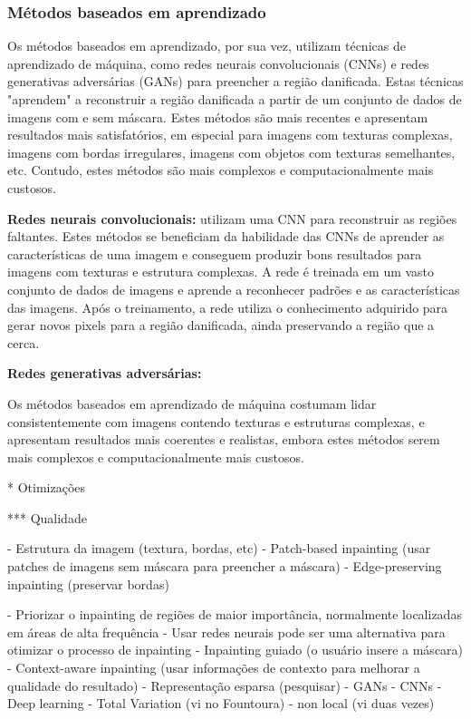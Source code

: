 \subsubsection{Métodos baseados em aprendizado} \label{learn}
Os métodos baseados em aprendizado, por sua vez, utilizam técnicas de aprendizado de máquina, como redes neurais convolucionais (CNNs) e redes generativas adversárias (GANs) para preencher a região danificada. Estas técnicas "aprendem" a reconstruir a região danificada a partir de um conjunto de dados de imagens com e sem máscara. Estes métodos são mais recentes e apresentam resultados mais satisfatórios, em especial para imagens com texturas complexas, imagens com bordas irregulares, imagens com objetos com texturas semelhantes, etc. Contudo, estes métodos são mais complexos e computacionalmente mais custosos.

\begin{list}{}{}
\item \textbf{Redes neurais convolucionais:} \label{cnn}
utilizam uma CNN para reconstruir as regiões faltantes. Estes métodos se beneficiam da habilidade das CNNs de aprender as características de uma imagem e conseguem produzir bons resultados para imagens com texturas e estrutura complexas. A rede é treinada em um vasto conjunto de dados de imagens e aprende a reconhecer padrões e as características das imagens. Após o treinamento, a rede utiliza o conhecimento adquirido para gerar novos pixels para a região danificada, ainda preservando a região que a cerca.
\item \textbf{Redes generativas adversárias:} \label{gan}

\end{list}


Os métodos baseados em aprendizado de máquina costumam lidar consistentemente com imagens contendo texturas e estruturas complexas, e apresentam resultados mais coerentes e realistas, embora estes métodos serem mais complexos e computacionalmente mais custosos.






* Otimizações

*** Qualidade

- Estrutura da imagem (textura, bordas, etc)
- Patch-based inpainting (usar patches de imagens sem máscara para preencher a máscara)
- Edge-preserving inpainting (preservar bordas)

- Priorizar o inpainting de regiões de maior importância, normalmente localizadas em áreas de alta frequência
- Usar redes neurais pode ser uma alternativa para otimizar o processo de inpainting
- Inpainting guiado (o usuário insere a máscara)
- Context-aware inpainting (usar informações de contexto para melhorar a qualidade do resultado)
- Representação esparsa (pesquisar)
- GANs
- CNNs
- Deep learning
- Total Variation (vi no Fountoura)
- non local (vi duas vezes)




